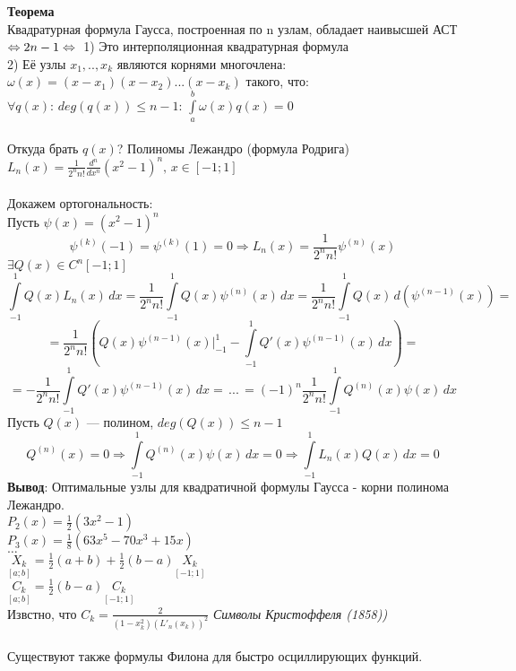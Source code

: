 \textbf{Теорема}\\
Квадратурная формула Гаусса, построенная по n узлам, обладает наивысшей АСТ $\Leftrightarrow 2n-1 \Leftrightarrow\\$
1) Это интерполяционная квадратурная формула\\
2) Её узлы $x_1,..,x_k$ являются корнями многочлена:\\
$\omega(x) = (x-x_1)(x-x_2)...(x-x_k)$ такого, что:\\
$\forall q(x): \, deg(q(x)) \leq n-1 :\, \int\limits_{a}^{b}\omega(x)q(x) = 0$\\
\\
Откуда брать $q(x)$? Полиномы Лежандро (формула Родрига)\\
$L_n(x) = \frac{1}{2^nn!}\frac{d^n}{dx^n}(x^2-1)^n, \,x\in[-1;1]$\\
\\
Докажем ортогональность:\\
Пусть $\psi(x) = (x^2-1)^n$
\[
\psi^{(k)}(-1) = \psi^{(k)}(1) = 0 \Rightarrow L_n(x) = \frac{1}{2^nn!}\psi^{(n)}(x)
\]
$\exists Q(x) \in C^n[-1;1]$
\[
\int\limits_{-1}^{1} Q(x)L_n(x)\,dx = \frac{1}{2^nn!}\int\limits_{-1}^{1} Q(x)\psi^{(n)}(x)\,dx = \frac{1}{2^nn!}\int\limits_{-1}^{1} Q(x)\,d(\psi^{(n-1)}(x)) =
\]
\[
= \frac{1}{2^nn!}\left(Q(x)\psi^{(n-1)}(x)\bigg |^1_{-1}-\int\limits_{-1}^{1} Q'(x)\psi^{(n-1)}(x)\,dx\right) =
\]
\[
= -\frac{1}{2^nn!}\int\limits_{-1}^{1} Q'(x)\psi^{(n-1)}(x)\,dx = \, ...\, =(-1)^n\frac{1}{2^nn!}\int\limits_{-1}^{1} Q^{(n)}(x)\psi(x)\,dx
\]
Пусть $Q(x)$ --- полином, $deg(Q(x)) \leq n-1$\\
\[
Q^{(n)}(x) = 0 \Rightarrow \int\limits_{-1}^{1} Q^{(n)}(x)\psi(x)\,dx =0 \Rightarrow \int\limits_{-1}^{1} L_n(x)Q(x)\,dx = 0
\]
\textbf{Вывод}: Оптимальные узлы для квадратичной формулы Гаусса - корни полинома Лежандро.\\
$P_2(x) = \frac{1}{2}(3x^2-1)$\\
$P_3(x) = \frac{1}{8}(63x^5-70x^3+15x)$\\
$\dots$\\
$\underset{[a;b]}{X_k} = \frac{1}{2}(a+b) +\frac{1}{2}(b-a)\underset{[-1;1]}{X_k}$\\
$\underset{[a;b]}{C_k}=\frac{1}{2}(b-a)\underset{[-1;1]}{C_k}$\\
Извстно, что $C_k = \frac{2}{(1-x^2_k)(L'_n(x_k))^2}$ \textit{Символы Кристоффеля (1858))} \\
\\
Существуют также формулы Филона для быстро осциллирующих функций.
